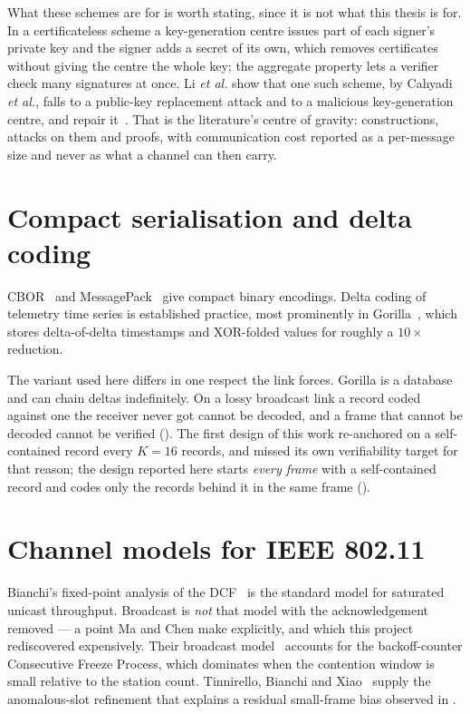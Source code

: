 What these schemes are for is worth stating, since it is not what this thesis is for. In a
certificateless scheme a key-generation centre issues part of each signer's private key and the
signer adds a secret of its own, which removes certificates without giving the centre the whole
key; the aggregate property lets a verifier check many signatures at once. Li \emph{et al.}
show that one such scheme, by Cahyadi \emph{et al.}, falls to a public-key replacement attack
and to a malicious key-generation centre, and repair it~\cite{li2025clas}. That is the
literature's centre of gravity: constructions, attacks on them and proofs, with communication
cost reported as a per-message size and never as what a channel can then carry.

\section{Compact serialisation and delta coding}

CBOR~\cite{rfc8949} and MessagePack~\cite{msgpack} give compact binary encodings. Delta coding of
telemetry time series is established practice, most prominently in Gorilla~\cite{pelkonen2015gorilla},
which stores delta-of-delta timestamps and XOR-folded values for roughly a $10\times$ reduction.

The variant used here differs in one respect the link forces. Gorilla is a database and can chain
deltas indefinitely. On a lossy broadcast link a record coded against one the receiver never got
cannot be decoded, and a frame that cannot be decoded cannot be verified ().
The first design of this work re-anchored on a self-contained record every $K = 16$ records, and
missed its own verifiability target for that reason; the design reported here starts
\emph{every frame} with a self-contained record and codes only the records behind it in the same
frame ().

\section{Channel models for IEEE 802.11}

Bianchi's fixed-point analysis of the DCF~\cite{bianchi2000} is the standard model for saturated
unicast throughput. Broadcast is \emph{not} that model with the acknowledgement removed --- a point
Ma and Chen make explicitly, and which this project rediscovered expensively. Their broadcast
model~\cite{machen2007,machen2008} accounts for the backoff-counter Consecutive Freeze Process,
which dominates when the contention window is small relative to the station count. Tinnirello,
Bianchi and Xiao~\cite{tinnirello2010} supply the anomalous-slot refinement that explains a
residual small-frame bias observed in .

